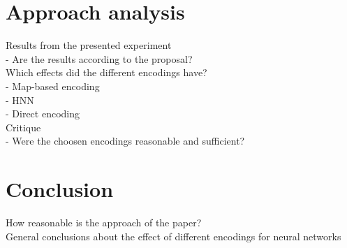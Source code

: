\documentclass[12pt,twoside]{article}
\theoremstyle{plain}
\theoremstyle{definition}
\theoremstyle{remark}
\begin{document}
\section{Approach analysis}
\label{sec:analysis}

Results from the presented experiment\\
- Are the results according to the proposal?\\
Which effects did the different encodings have?\\
- Map-based encoding\\
- HNN\\
- Direct encoding\\
Critique\\
- Were the choosen encodings reasonable and sufficient?\\



\section{Conclusion}
\label{sec:concl}

How reasonable is the approach of the paper?\\
General conclusions about the effect of different encodings for neural networks\\

%
%
\newpage


\end{document}
